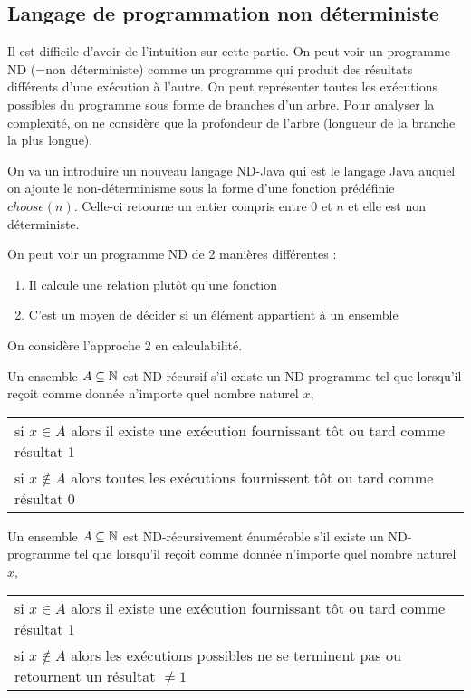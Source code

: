 
\subsection{Langage de programmation non déterministe}
\label{ssub:langague_de_programmation_non_d_terministe}

\begin{myrem}
	Il est difficile d'avoir de l'intuition sur cette partie. On peut
	voir un programme ND (=non déterministe) comme un programme qui produit des résultats
	différents d'une exécution à l'autre. On peut représenter toutes
	les exécutions possibles du programme sous forme de branches d'un
	arbre. Pour analyser la complexité, on ne
	considère que la profondeur de l'arbre (longueur de la branche
	la plus longue).
\end{myrem}

On va un introduire un nouveau langage ND-Java qui est le langage Java
auquel on ajoute le non-déterminisme sous la forme d'une fonction
prédéfinie $choose(n)$. Celle-ci retourne un entier compris entre $0$ et $n$ et elle
est non déterministe.

On peut voir un programme ND de 2 manières différentes :
\begin{enumerate}
	\item Il calcule une relation plutôt qu'une fonction
	\item C'est un moyen de décider si un élément appartient à un
		ensemble
\end{enumerate}
On considère l'approche 2 en calculabilité.

\begin{mydef}[ND-récursif] \label{def:ND-rec}
	Un ensemble $A \subseteq \mathbb{N}$ est ND-récursif s’il existe un
	ND-programme tel que lorsqu'il reçoit comme donnée n'importe quel nombre
	naturel $x$, \\
	\begin{tabular}{l}
	si $x \in A$ alors il existe une exécution fournissant tôt ou tard
	comme résultat 1 \\
	si $x \notin A$ alors toutes les exécutions fournissent tôt ou tard
	comme résultat 0 \\
	\end{tabular}
\end{mydef}

\begin{mydef} \label{def:ND-recenum}
	Un ensemble $A \subseteq \mathbb{N}$ est ND-récursivement énumérable s’il existe un
	ND-programme tel que lorsqu'il reçoit comme donnée n'importe quel nombre
	naturel $x$, \\
	\begin{tabular}{l}
	si $x \in A$ alors il existe une exécution fournissant tôt ou tard
	comme résultat 1 \\
	si $x \notin A$ alors les exécutions possibles ne se terminent pas ou
	retournent un résultat $\neq 1$ \\
	\end{tabular}
\end{mydef}

